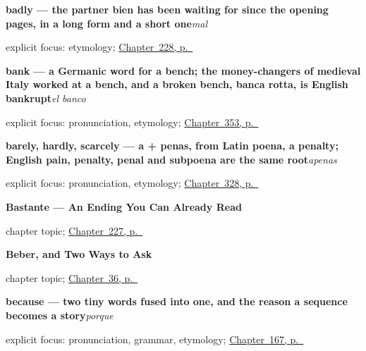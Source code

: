 \noindent\begin{minipage}[t]{\linewidth}
\raggedright
\textbf{badly — the partner bien has been waiting for since the opening pages, in a long form and a short one}\enspace\emph{mal}\par
\footnotesize explicit focus: etymology; \hyperref[ch:mal]{Chapter~228, p.~\pageref*{ch:mal}}
\end{minipage}\par\smallskip

\noindent\begin{minipage}[t]{\linewidth}
\raggedright
\textbf{bank — a Germanic word for a bench; the money-changers of medieval Italy worked at a bench, and a broken bench, banca rotta, is English bankrupt}\enspace\emph{el banco}\par
\footnotesize explicit focus: pronunciation, etymology; \hyperref[ch:el-hospital-y-el-banco]{Chapter~353, p.~\pageref*{ch:el-hospital-y-el-banco}}
\end{minipage}\par\smallskip

\noindent\begin{minipage}[t]{\linewidth}
\raggedright
\textbf{barely, hardly, scarcely — a + penas, from Latin poena, a penalty; English pain, penalty, penal and subpoena are the same root}\enspace\emph{apenas}\par
\footnotesize explicit focus: pronunciation, etymology; \hyperref[ch:asi-y-incluso]{Chapter~328, p.~\pageref*{ch:asi-y-incluso}}
\end{minipage}\par\smallskip

\noindent\begin{minipage}[t]{\linewidth}
\raggedright
\textbf{Bastante --- An Ending You Can Already Read}\par
\footnotesize chapter topic; \hyperref[ch:bastante]{Chapter~227, p.~\pageref*{ch:bastante}}
\end{minipage}\par\smallskip

\noindent\begin{minipage}[t]{\linewidth}
\raggedright
\textbf{Beber, and Two Ways to Ask}\par
\footnotesize chapter topic; \hyperref[ch:spanish-beber-preguntas]{Chapter~36, p.~\pageref*{ch:spanish-beber-preguntas}}
\end{minipage}\par\smallskip

\noindent\begin{minipage}[t]{\linewidth}
\raggedright
\textbf{because — two tiny words fused into one, and the reason a sequence becomes a story}\enspace\emph{porque}\par
\footnotesize explicit focus: pronunciation, grammar, etymology; \hyperref[ch:spanish-narrating]{Chapter~167, p.~\pageref*{ch:spanish-narrating}}
\end{minipage}\par\smallskip

